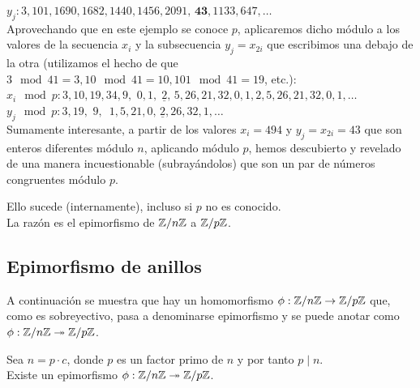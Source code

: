 \begin{ejemplo}
$y_j: 3, 101, 1690, 1682, 1440, 1456, 2091, \,\textbf{43}, 1133, 647, \dots$ \\
Aprovechando que en este ejemplo se conoce $p$, aplicaremos dicho módulo a los valores de la secuencia $x_i$ y la subsecuencia $y_j=x_{2i}$ que escribimos una debajo de la otra (utilizamos el hecho de que $3 \mod 41 = 3, 10 \mod 41 = 10, 101 \mod 41 = 19$, etc.): \\
$x_i \mod p: 3, 10, 19, 34, 9, \,\,0, 1, \;\underline{2}, \,5, 26, 21, 32, 0, 1, 2, 5, 26, 21, 32, 0, 1, \dots$ \\
$y_j \mod p: 3, 19, \,\,9, \,\,\,1, 5, 21, 0, \,\underline{2}, 26, 32, 1, \dots$ \\ 
Sumamente interesante, a partir de los valores $x_{i}=494$ y $y_j=x_{2i}=43$ que son enteros diferentes módulo $n$, aplicando módulo $p$, hemos descubierto y revelado de una manera incuestionable (subrayándolos) que son un par de números congruentes módulo $p$.
\end{ejemplo}

Ello sucede (internamente), incluso si $p$ no es conocido. \\
La razón es el epimorfismo de $\mathbb{Z}/n\mathbb{Z}$ a $\mathbb{Z}/p\mathbb{Z}$.

\subsection{Epimorfismo de anillos}
A continuación se muestra que hay un homomorfismo $\phi: \mathbb{Z}/n\mathbb{Z} \to \mathbb{Z}/p\mathbb{Z}$ que, como es sobreyectivo, pasa a denominarse epimorfismo y se puede anotar como $\phi: \mathbb{Z}/n\mathbb{Z} \twoheadrightarrow \mathbb{Z}/p\mathbb{Z}$. 

\begin{enunciado}
Sea $n=p \cdot c$, donde $p$ es un factor primo de $n$ y por tanto $p \mid n$. \\
Existe un epimorfismo $\phi: \mathbb{Z}/n\mathbb{Z} \twoheadrightarrow \mathbb{Z}/p\mathbb{Z}$. 
\end{enunciado}

